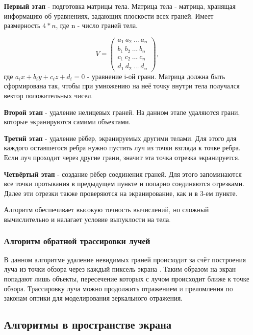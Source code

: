 \textbf{Первый этап} - подготовка матрицы тела. Матрица тела - матрица, хранящая информацию об уравнениях, задающих плоскости всех граней. Имеет размерность $4*n$, где n - число граней тела.

\begin{equation}
	\label{eq:body_matrix}
	V = \begin{pmatrix}
		a_1\ a_2\ \dots\ a_n \\
		b_1\ b_2\ \dots\ b_n \\
		c_1\ c_2\ \dots\ c_n \\
		d_1\ d_2\ \dots\ d_n 
	\end{pmatrix},
\end{equation}
где $ a_ix + b_iy + c_iz + d_i = 0 $ - уравнение i-ой грани. Матрица должна быть сформирована так, чтобы при умножению на неё точку внутри тела получался вектор положительных чисел.

\textbf{Второй этап} - удаление нелицевых граней. На данном этапе удаляются грани, которые экранируются самими объектами.

\textbf{Третий этап} - удаление рёбер, экранируемых другими телами. Для этого для каждого оставшегося ребра нужно пустить луч из точки взгляда к точке ребра. Если луч проходит через другие грани, значит эта точка отрезка экранируется. 

\textbf{Четвёртый этап} - создание рёбер соединения граней. Для этого запоминаются все точки протыкания в предыдущем пункте и попарно соединяются отрезками. Далее эти отрезки также проверяются на экранирование, как и в 3-ем пункте.

Алгоритм обеспечивает высокую точность вычислений, но сложный вычислительно и налагает условие выпуклости на тела.

\subsubsection{Алгоритм обратной трассировки лучей}
В данном алгоритме удаление невидимых граней происходит за счёт построения луча из точки обзора через каждый пиксель экрана \cite{gabriella}. Таким образом на экран попадают лишь объекты, пересечение которых с лучом происходит ближе к точке обзора. Трассировку луча можно продолжить отражением и преломления по законам оптики для моделирования зеркального отражения.

\subsection{Алгоритмы в пространстве экрана}
